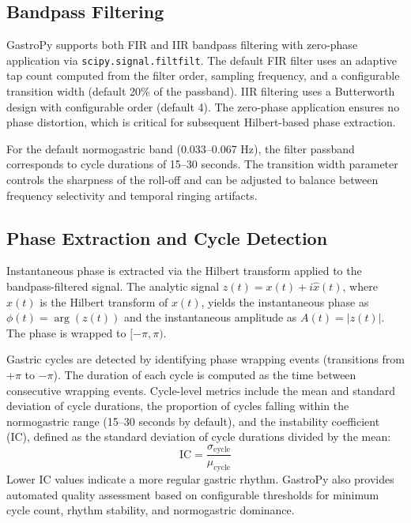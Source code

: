 \documentclass[12pt]{article}
\begin{document}
\subsection{Bandpass Filtering}

GastroPy supports both FIR and IIR bandpass filtering with zero-phase
application via \texttt{scipy.signal.filtfilt}. The default FIR filter uses an
adaptive tap count computed from the filter order, sampling frequency, and a
configurable transition width (default 20\% of the passband). IIR filtering
uses a Butterworth design with configurable order (default 4). The zero-phase
application ensures no phase distortion, which is critical for subsequent
Hilbert-based phase extraction.

For the default normogastric band (0.033--0.067 Hz), the filter passband
corresponds to cycle durations of 15--30 seconds. The transition width
parameter controls the sharpness of the roll-off and can be adjusted to balance
between frequency selectivity and temporal ringing artifacts.

\subsection{Phase Extraction and Cycle Detection}

Instantaneous phase is extracted via the Hilbert transform applied to the
bandpass-filtered signal. The analytic signal $z(t) = x(t) + i\hat{x}(t)$,
where $\hat{x}(t)$ is the Hilbert transform of $x(t)$, yields the
instantaneous phase as $\phi(t) = \arg(z(t))$ and the instantaneous amplitude
as $A(t) = |z(t)|$. The phase is wrapped to $[-\pi, \pi)$.

Gastric cycles are detected by identifying phase wrapping events (transitions
from $+\pi$ to $-\pi$). The duration of each cycle is computed as the time
between consecutive wrapping events. Cycle-level metrics include the mean and
standard deviation of cycle durations, the proportion of cycles falling within
the normogastric range (15--30 seconds by default), and the instability
coefficient (IC), defined as the standard deviation of cycle durations divided
by the mean:
\begin{equation}
  \text{IC} = \frac{\sigma_{\text{cycle}}}{\mu_{\text{cycle}}}
\end{equation}
Lower IC values indicate a more regular gastric rhythm. GastroPy also provides
automated quality assessment based on configurable thresholds for minimum cycle
count, rhythm stability, and normogastric dominance.
\end{document}
